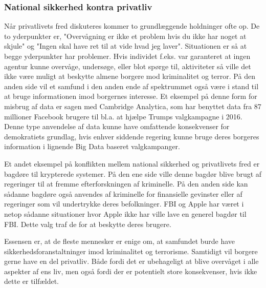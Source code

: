 \subsubsection{National sikkerhed kontra privatliv}
\label{national_privatliv}
Når privatlivets fred diskuteres kommer to grundlæggende holdninger ofte op. De to yderpunkter er, "Overvågning er ikke et problem hvis du ikke har noget at skjule" og "Ingen skal have ret til at vide hvad jeg laver". Situationen er så at begge yderpunkter har problemer. Hvis individet f.eks. var garanteret at ingen agentur kunne overvåge, undersøge, eller blot spørge til, aktiviteter så ville det ikke være muligt at beskytte almene borgere mod kriminalitet og terror. På den anden side vil et samfund i den anden ende af spektrummet også være i stand til at bruge informationen imod borgernes interesse. 
Et eksempel på denne form for misbrug af data er sagen med Cambridge Analytica, som har benyttet data fra 87 millioner Facebook brugere til bl.a. at hjælpe Trumps valgkampagne i 2016.\cite{Cambridge_Analytica_Zuckerberg} Denne type anvendelse af data kunne have omfattende konsekvenser for demokratiets grundlag, hvis enhver siddende regering kunne bruge deres borgeres information i lignende Big Data baseret valgkampanger. 

Et andet eksempel på konflikten mellem national sikkerhed og privatlivets fred er bagdøre til krypterede systemer. På den ene side ville denne bagdør blive brugt af regeringer til at fremme efterforskningen af kriminelle. På den anden side kan sådanne bagdøre også anvendes af kriminelle for finansielle gevinster eller af regeringer som vil undertrykke deres befolkninger. FBI og Apple har været i netop sådanne situationer hvor Apple ikke har ville lave en generel bagdør til FBI. Dette valg traf de for at beskytte deres brugere.\cite{FBI/Apple_encryption}

Essensen er, at de fleste mennesker er enige om, at samfundet burde have sikkerhedsforanstaltninger imod kriminalitet og terrorisme. Samtidigt vil borgere gerne have en del privatliv. Både fordi det er ubehageligt at blive overvåget i alle aspekter af ens liv, men også fordi der er potentielt store konsekvenser, hvis ikke dette er tilfældet.



